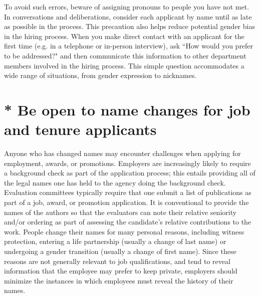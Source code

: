 To avoid such errors, beware of assigning pronouns to people you have not met. In conversations and deliberations, consider each applicant by name until as late as possible in the process. This precaution also helps reduce potential gender bias in the hiring process. When you make direct contact with an applicant for the first time (e.g. in a telephone or in-person interview), ask ``How would you prefer to be addressed?" and then communicate this information to other department members involved in the hiring process. This simple question accommodates a wide range of situations, from gender expression to nicknames.


\section {* Be open to name changes for job and tenure applicants}
\label{job-name-change}
Anyone who has changed names may encounter challenges when applying for employment, awards, or promotions. Employers are increasingly likely to require a background check as part of the application process; this entails providing all of the legal names one has held to the agency doing the background check. Evaluation committees typically require that one submit a list of publications as part of a job, award, or promotion application. It is conventional to provide the names of the authors so that the evaluators can note their relative seniority and/or ordering as part of assessing the candidate's relative contributions to the work. People change their names for many personal reasons, including witness protection, entering a life partnership (usually a change of last name) or undergoing a gender transition (usually a change of first name). Since these reasons are not generally relevant to job qualifications, and tend to reveal information that the employee may prefer to keep private, employers should minimize the instances in which employees must reveal the history of their names.

